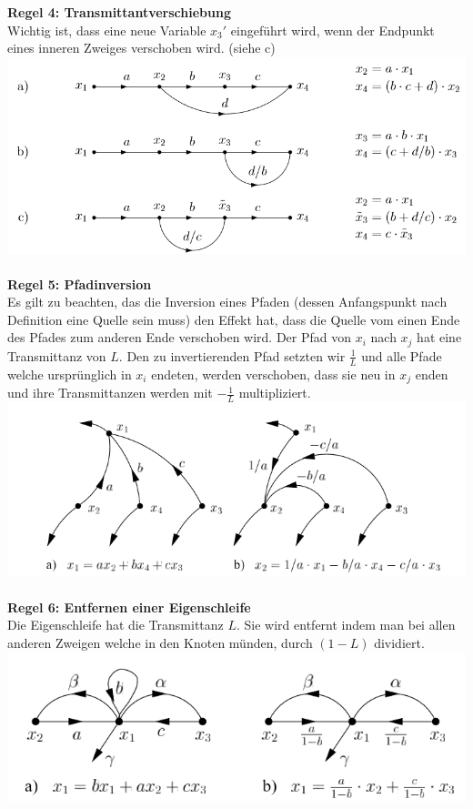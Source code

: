 \noindent\textbf{Regel 4: Transmittantverschiebung}\\
 Wichtig ist, dass eine neue Variable $x_3'$ eingeführt wird, wenn
der Endpunkt eines inneren Zweiges verschoben wird. (siehe c)\\
\includegraphics[width=\columnwidth]{Images/sfd_r4}~\\

\noindent\textbf{Regel 5: Pfadinversion}\\
 Es gilt zu beachten, das die Inversion eines Pfaden (dessen
Anfangspunkt nach Definition eine Quelle sein muss) den Effekt
hat, dass die Quelle vom einen Ende des Pfades zum
anderen Ende verschoben wird. Der Pfad von $x_i$ nach $x_j$ hat
eine Transmittanz von $L$. Den zu invertierenden Pfad setzten
wir $\frac{1}{L}$ und alle Pfade welche ursprünglich in $x_i$ endeten,
werden verschoben, dass sie neu in $x_j$ enden und ihre Transmittanzen
werden mit $-\frac{1}{L}$ multipliziert.\\
\includegraphics[width=\columnwidth]{Images/sfd_r5}~\\

\noindent\textbf{Regel 6: Entfernen einer Eigenschleife}\\
 Die Eigenschleife hat die Transmittanz $L$. Sie wird entfernt
indem man bei allen anderen Zweigen welche in den Knoten
münden, durch $(1 - L)$ dividiert.\\
\includegraphics[width=\columnwidth]{Images/sfd_r6}~\\


